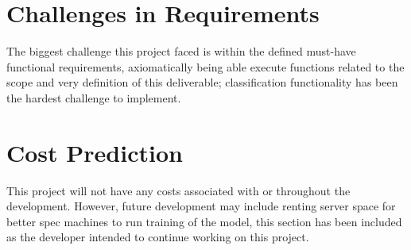 \section{Challenges in Requirements}

The biggest challenge this project faced is within the defined must-have functional requirements, axiomatically being able execute functions related to the scope and very definition of this deliverable; classification functionality has been the hardest challenge to implement.

\section{Cost Prediction}

This project will not have any costs associated with or throughout the development. However, future development may include renting server space for better spec machines to run training of the model, this section has been included as the developer intended to continue working on this project.